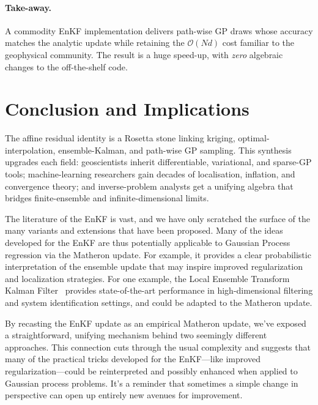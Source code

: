 \documentclass[runningheads]{llncs}
\begin{document}
\paragraph{Take-away.}
A commodity EnKF implementation delivers path-wise GP draws whose accuracy matches the
analytic update while retaining the $\mathcal O(Nd)$ cost familiar to
the geophysical community.
The result is a huge speed-up, with \emph{zero}
algebraic changes to the off-the-shelf code.



\section{Conclusion and Implications}

The affine residual identity is a Rosetta stone linking kriging, optimal-interpolation, ensemble-Kalman, and path-wise GP sampling. This synthesis upgrades each field: geoscientists inherit differentiable, variational, and sparse-GP tools; machine-learning researchers gain decades of localisation, inflation, and convergence theory; and inverse-problem analysts get a unifying algebra that bridges finite-ensemble and infinite-dimensional limits.

The literature of the EnKF is vast, and we have only scratched the surface of the many variants and extensions that have been proposed.
Many of the ideas developed for the EnKF are thus potentially applicable to Gaussian Process regression via the Matheron update.
For example, it provides a clear probabilistic interpretation of the ensemble update that may inspire improved regularization and localization strategies.
For one example, the Local Ensemble Transform Kalman Filter~\cite{Bocquet2020Online} provides state-of-the-art performance in high-dimensional filtering and system identification settings, and could be adapted to the Matheron update.

By recasting the EnKF update as an empirical Matheron update, we've exposed a straightforward, unifying mechanism behind two seemingly different approaches. This connection cuts through the usual complexity and suggests that many of the practical tricks developed for the EnKF—like improved regularization—could be reinterpreted and possibly enhanced when applied to Gaussian process problems. It's a reminder that sometimes a simple change in perspective can open up entirely new avenues for improvement.
\end{document}
